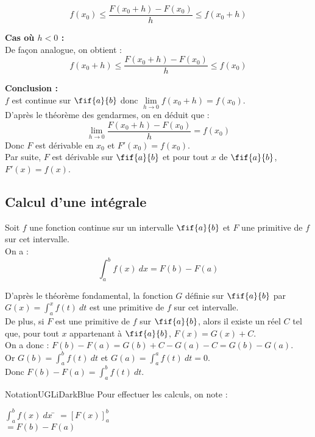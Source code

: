 \documentclass[a4paper,11pt,cours]{nsi} %
\begin{document}
\begin{demonstration}
    $$f(x_0)\leqslant \dfrac{F(x_0+h)-F(x_0)}{h}\leqslant f(x_0+h)$$

    \textbf{Cas où $h<0$ :}\\
    De façon analogue, on obtient :
    $$f(x_0+h)\leqslant \dfrac{F(x_0+h)-F(x_0)}{h}\leqslant f(x_0)$$
    
    \textbf{Conclusion :}\\
    $f$ est continue sur $\fif{a}{b}$ donc $\displaystyle \lim\limits_{h \to 0} f(x_0+h)=f(x_0)$.\\[.5em]
    D'après le théorème des gendarmes, on en déduit que :
    $$\lim\limits_{h \to 0} \dfrac{F(x_0+h)-F(x_0)}{h}=f(x_0)$$
    Donc $F$ est dérivable en $x_0$ et $F'(x_0)=f(x_0)$.\\
    Par suite, $F$ est dérivable sur $\fif{a}{b}$ et pour tout $x$ de $\fif{a}{b}$, $F'(x)=f(x)$.
\end{demonstration}

\subsection*{Calcul d'une intégrale}

\begin{propriete}[]
    Soit $f$ une fonction continue sur un intervalle $\fif{a}{b}$ et $F$ une primitive de $f$ sur cet intervalle.\\
    On a :
    $$\int_a^b f(x) \ dx = F(b)-F(a)$$
\end{propriete}
\begin{demonstration}
    D'après le théorème fondamental, la fonction $G$ définie sur $\fif{a}{b}$ par $\displaystyle G(x)=\int_a^x f(t) \ dt$ est une primitive de $f$ sur cet intervalle.\\
    \newpage
    De plus, si $F$ est une primitive de $f$ sur $\fif{a}{b}$, alors il existe un réel $C$ tel que, pour tout $x$ appartenant à $\fif{a}{b}$, $F(x)=G(x)+C$.\\
    On a donc : $F(b)-F(a)=G(b)+C-G(a)-C=G(b)-G(a)$.\\
    Or $G(b)=\displaystyle \int_a^b f(t) \ dt$ et $\displaystyle G(a)=\int_a^a f(t) \ dt=0$.\\
    Donc $\displaystyle F(b)-F(a)=\int_a^b f(t) \ dt$.
\end{demonstration}

\begin{encadrecolore}{Notation}{UGLiDarkBlue}
    Pour effectuer les calculs, on note :
    \begin{tabbing}
        $\displaystyle \int_a^b f(x) \ dx$ \= $=\left[F(x)\right]_a^b$\\
        \> $=F(b)-F(a)$
    \end{tabbing}
\end{encadrecolore}
\end{document}
